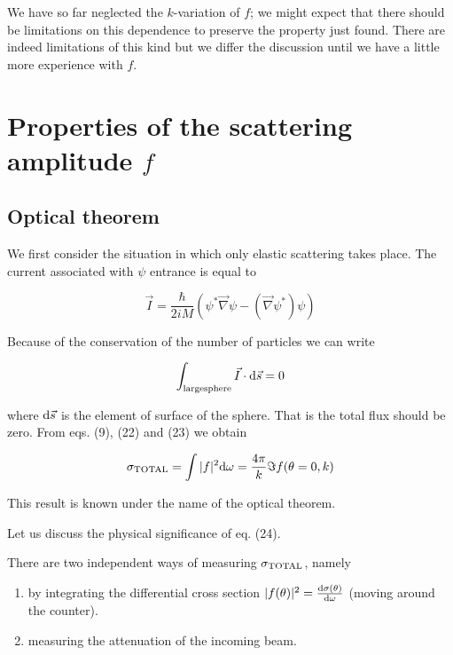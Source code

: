 We have so far neglected the $k$-variation of $f$; we might expect that there should be limitations on this dependence to preserve the property just found. There are indeed limitations of this kind but we differ the discussion until we have a little more experience with $f$.


\section{Properties of the scattering amplitude $f$}

\subsection{Optical theorem}

We first consider the situation in which only elastic scattering takes place. The current associated with $\psi$ entrance is equal to

\begin{equation}
\vec{I} = \frac{\hbar}{2iM} \left( \psi^* \vec{\nabla} \psi - \left( \vec{\nabla} \psi^* \right) \psi \right)
\end{equation}

\noindent Because of the conservation of the number of particles we can write

\begin{equation}
\int_{\rm large sphere} \vec{I} \cdot {\rm d}\vec{s} = 0
\end{equation}

\noindent where ${\rm d}\vec{s}$ is the element of surface of the sphere. That is the total flux should be zero. From eqs. (9), (22) and (23) we obtain

\begin{equation}
\sigma_{\rm TOTAL} = \int |f|^2 {\rm d}\omega = \frac{4\pi}{k} \Im f(\theta=0,k)
\end{equation}

\noindent This result is known under the name of the optical theorem.

Let us discuss the physical significance of eq. (24).

There are two independent ways of measuring $\sigma_{\rm TOTAL}$, namely

\begin{enumerate}
\item{by integrating the differential cross section $|f(\theta)|^2 = \frac{{\rm d}\sigma(\theta)}{{\rm d}\omega}$ (moving around the counter).}
\item{measuring the attenuation of the incoming beam.}
\end{enumerate}

